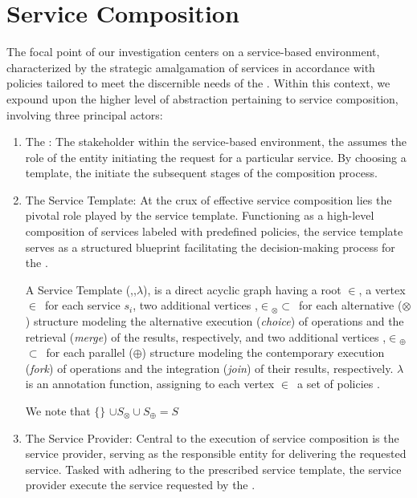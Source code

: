 \section{Service Composition}
The focal point of our investigation centers on a service-based environment, characterized by the strategic amalgamation of services in accordance with policies tailored to meet the discernible needs of the \user. Within this context, we expound upon the higher level of abstraction pertaining to service composition, involving three principal actors:
\begin{enumerate}
  \item The \User:
        The stakeholder within the service-based environment,
        the \user assumes the role of the entity initiating the request for a particular service.
        By choosing a template, the \user initiate the subsequent stages of the composition process.
  \item The Service Template:
        At the crux of effective service composition lies the pivotal role played by the service template.
        Functioning as a high-level composition of services labeled with predefined policies,
        the service template serves as a structured blueprint facilitating the decision-making process for the  \user.
        \begin{definition} \label{def:pipeline}
          A Service Template \T(\V,\E,$\lambda$), is a direct acyclic graph having a root $\in$\V, a vertex $\in$\V\ for each service $s_i$,
          two additional vertices ,$\in$\V$_{\otimes}$$\subset$\V\ for each alternative ($\otimes$) structure modeling the alternative execution (\emph{choice}) of operations and the retrieval (\emph{merge}) of the results,
                respectively, and two additional vertices ,$\in$\V$_{\oplus}$$\subset$\V\ for each parallel ($\oplus$) structure modeling the contemporary execution (\emph{fork}) of operations and the integration (\emph{join}) of their results, respectively. $\lambda$ is an annotation function, assigning to each vertex $\in$\V\ a set of policies .
        \end{definition}
        We note that $\{$$\}$ $\cup S_\otimes\cup S_\oplus=S$\\
  \item The Service Provider:
        Central to the execution of service composition is the service provider,
        serving as the responsible entity for delivering the requested service.
        Tasked with adhering to the prescribed service template, the service provider execute the service requested by the \user.
\end{enumerate}

